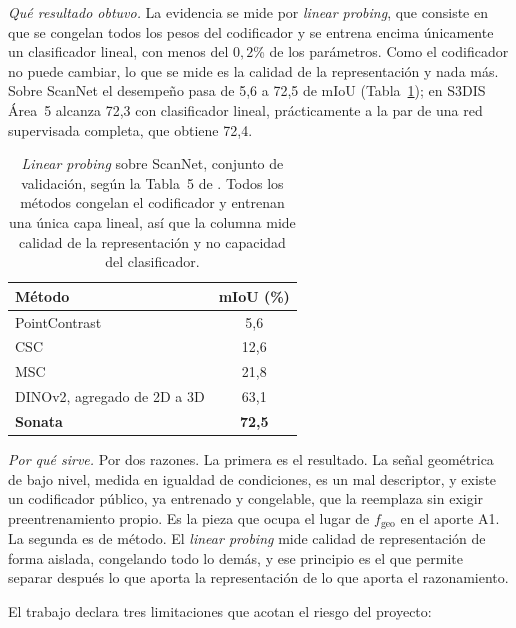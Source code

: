 \emph{Qué resultado obtuvo.} La evidencia se mide por \emph{linear probing}, que consiste en que se
congelan todos los pesos del codificador y se entrena encima únicamente un
clasificador lineal, con menos del $0{,}2$\% de los parámetros. Como el
codificador no puede cambiar, lo que se mide es la calidad de la representación y
nada más. Sobre ScanNet el desempeño pasa de 5,6 a 72,5 de mIoU
(Tabla~\ref{tab:linprobe}); en S3DIS Área~5 alcanza 72,3 con clasificador lineal,
prácticamente a la par de una red supervisada completa, que obtiene
72,4.

\begin{table}[!htbp]
\centering
{}\small
\caption[\emph{Linear probing} sobre ScanNet]{\emph{Linear probing} sobre ScanNet, conjunto de validación, según la
Tabla~5 de \cite{wu2025sonata}. Todos los métodos congelan el codificador y
entrenan una única capa lineal, así que la columna mide calidad de la
representación y no capacidad del clasificador.}
\label{tab:linprobe}
\begin{tabular}{lc}
\hline
Método & mIoU (\%) \\
\hline
PointContrast & 5,6 \\
CSC & 12,6 \\
MSC & 21,8 \\
DINOv2, agregado de 2D a 3D & 63,1 \\
\textbf{Sonata} & \textbf{72,5} \\
\hline
\end{tabular}
\end{table}

\emph{Por qué sirve.} Por dos razones. La primera es el resultado. La señal
geométrica de bajo nivel, medida en igualdad de condiciones, es un mal
descriptor, y existe un codificador público, ya entrenado y congelable, que la
reemplaza sin exigir preentrenamiento propio. Es la pieza que ocupa el lugar de
$f_{\text{geo}}$ en el aporte A1. La segunda es de método. El \emph{linear
probing} mide calidad de representación de forma aislada, congelando todo lo
demás, y ese principio es el que permite separar después lo que aporta la
representación de lo que aporta el razonamiento.

El trabajo declara tres limitaciones que acotan el riesgo del proyecto:

